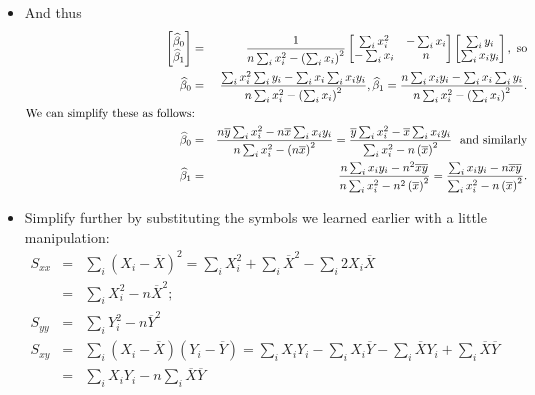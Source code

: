 \documentclass[11pt]{article}
\begin{document}
\begin{itemize}
\item And thus%
\begin{eqnarray*}
\begin{bmatrix}
\widehat{\beta }_{0} \\ 
\widehat{\beta }_{1}%
\end{bmatrix}
&=&\frac{1}{n\sum\nolimits_{i}x_{i}^{2}-\left( \sum\nolimits_{i}x_{i}\right)
^{2}}%
\begin{bmatrix}
\sum\nolimits_{i}x_{i}^{2} & -\sum\nolimits_{i}x_{i} \\ 
-\sum\nolimits_{i}x_{i} & n%
\end{bmatrix}%
\begin{bmatrix}
\sum\nolimits_{i}y_{i} \\ 
\sum\nolimits_{i}x_{i}y_{i}%
\end{bmatrix}%
,\text{ so} \\
\widehat{\beta }_{0} &=&\frac{\sum\nolimits_{i}x_{i}^{2}\sum%
\nolimits_{i}y_{i}-\sum\nolimits_{i}x_{i}\sum\nolimits_{i}x_{i}y_{i}}{%
n\sum\nolimits_{i}x_{i}^{2}-\left( \sum\nolimits_{i}x_{i}\right) ^{2}},%
\widehat{\beta }_{1}=\frac{n\sum\nolimits_{i}x_{i}y_{i}-\sum%
\nolimits_{i}x_{i}\sum\nolimits_{i}y_{i}}{n\sum\nolimits_{i}x_{i}^{2}-\left(
\sum\nolimits_{i}x_{i}\right) ^{2}}. \\
\text{We can simplify these as follows} &\text{:}& \\
\widehat{\beta }_{0} &=&\frac{n\overline{y}\sum\nolimits_{i}x_{i}^{2}-n%
\overline{x}\sum\nolimits_{i}x_{i}y_{i}}{n\sum\nolimits_{i}x_{i}^{2}-\left( n%
\overline{x}\right) ^{2}}=\frac{\overline{y}\sum\nolimits_{i}x_{i}^{2}-%
\overline{x}\sum\nolimits_{i}x_{i}y_{i}}{\sum\nolimits_{i}x_{i}^{2}-n\left( 
\overline{x}\right) ^{2}}\text{ \ and similarly} \\
\widehat{\beta }_{1} &=&\frac{n\sum\nolimits_{i}x_{i}y_{i}-n^{2}\overline{x}%
\overline{y}}{n\sum\nolimits_{i}x_{i}^{2}-n^{2}\left( \overline{x}\right)
^{2}}=\frac{\sum\nolimits_{i}x_{i}y_{i}-n\overline{x}\overline{y}}{%
\sum\nolimits_{i}x_{i}^{2}-n\left( \overline{x}\right) ^{2}}.
\end{eqnarray*}

\item Simplify further by substituting the symbols we learned earlier with a
little manipulation:%
\begin{eqnarray*}
S_{xx} &=&\sum\nolimits_{i}\left( X_{i}-\overline{X}\right)
^{2}=\sum\nolimits_{i}X_{i}^{2}+\sum\nolimits_{i}\overline{X}%
^{2}-\sum\nolimits_{i}2X_{i}\overline{X} \\
&=&\sum\nolimits_{i}X_{i}^{2}-n\overline{X}^{2}; \\
S_{yy} &=&\sum\nolimits_{i}Y_{i}^{2}-n\overline{Y}^{2} \\
S_{xy} &=&\sum\nolimits_{i}\left( X_{i}-\overline{X}\right) \left( Y_{i}-%
\overline{Y}\right) =\sum\nolimits_{i}X_{i}Y_{i}-\sum\nolimits_{i}X_{i}%
\overline{Y}-\sum\nolimits_{i}\overline{X}Y_{i}+\sum\nolimits_{i}\overline{X}%
\overline{Y} \\
&=&\sum\nolimits_{i}X_{i}Y_{i}-n\sum\nolimits_{i}\overline{X}\overline{Y}
\end{eqnarray*}


\end{itemize}
\end{document}
